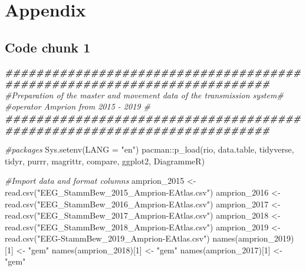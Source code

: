\documentclass[a4paper,11pt]{article}
\newenvironment{Shaded}{\begin{snugshade}}{\end{snugshade}}
\newcommand{\AttributeTok}[1]{\textcolor[rgb]{0.77,0.63,0.00}{#1}}
\newcommand{\CommentTok}[1]{\textcolor[rgb]{0.56,0.35,0.01}{\textit{#1}}}
\newcommand{\DecValTok}[1]{\textcolor[rgb]{0.00,0.00,0.81}{#1}}
\newcommand{\DocumentationTok}[1]{\textcolor[rgb]{0.56,0.35,0.01}{\textbf{\textit{#1}}}}
\newcommand{\FunctionTok}[1]{\textcolor[rgb]{0.00,0.00,0.00}{#1}}
\newcommand{\NormalTok}[1]{#1}
\newcommand{\OtherTok}[1]{\textcolor[rgb]{0.56,0.35,0.01}{#1}}
\newcommand{\SpecialCharTok}[1]{\textcolor[rgb]{0.00,0.00,0.00}{#1}}
\newcommand{\StringTok}[1]{\textcolor[rgb]{0.31,0.60,0.02}{#1}}
\begin{document}
\newpage

\appendix

\hypertarget{appendix}{%
\section{Appendix}\label{appendix}}

\hypertarget{code-chunk-1}{%
\subsection{Code chunk 1}\label{code-chunk-1}}
\begin{Shaded}
\begin{Highlighting}[]
\DocumentationTok{\#\#\#\#\#\#\#\#\#\#\#\#\#\#\#\#\#\#\#\#\#\#\#\#\#\#\#\#\#\#\#\#\#\#\#\#\#\#\#\#\#\#\#\#\#\#\#\#\#\#\#\#\#\#\#\#\#\#\#\#\#\#\#\#\#\#\#\#\#\#\#\#}
\CommentTok{\#Preparation of the master and movement data of the transmission system\# }
\CommentTok{\#operator Amprion from 2015 {-} 2019                                     \#}
\DocumentationTok{\#\#\#\#\#\#\#\#\#\#\#\#\#\#\#\#\#\#\#\#\#\#\#\#\#\#\#\#\#\#\#\#\#\#\#\#\#\#\#\#\#\#\#\#\#\#\#\#\#\#\#\#\#\#\#\#\#\#\#\#\#\#\#\#\#\#\#\#\#\#\#\#}

\CommentTok{\#packages}
\FunctionTok{Sys.setenv}\NormalTok{(}\AttributeTok{LANG =} \StringTok{"en"}\NormalTok{)}
\NormalTok{pacman}\SpecialCharTok{::}\FunctionTok{p\_load}\NormalTok{(rio, data.table, tidyverse, tidyr, purrr, magrittr, compare, }
\NormalTok{               ggplot2, DiagrammeR)}

\CommentTok{\#Import data and format columns}
\NormalTok{amprion\_2015 }\OtherTok{\textless{}{-}} \FunctionTok{read.csv}\NormalTok{(}\StringTok{"EEG\_StammBew\_2015\_Amprion{-}EAtlas.csv"}\NormalTok{)}
\NormalTok{amprion\_2016 }\OtherTok{\textless{}{-}} \FunctionTok{read.csv}\NormalTok{(}\StringTok{"EEG\_StammBew\_2016\_Amprion{-}EAtlas.csv"}\NormalTok{)}
\NormalTok{amprion\_2017 }\OtherTok{\textless{}{-}} \FunctionTok{read.csv}\NormalTok{(}\StringTok{"EEG\_StammBew\_2017\_Amprion{-}EAtlas.csv"}\NormalTok{)}
\NormalTok{amprion\_2018 }\OtherTok{\textless{}{-}} \FunctionTok{read.csv}\NormalTok{(}\StringTok{"EEG\_StammBew\_2018\_Amprion{-}EAtlas.csv"}\NormalTok{)}
\NormalTok{amprion\_2019 }\OtherTok{\textless{}{-}} \FunctionTok{read.csv}\NormalTok{(}\StringTok{"EEG{-}StammBew\_2019\_Amprion{-}EAtlas.csv"}\NormalTok{)}
\FunctionTok{names}\NormalTok{(amprion\_2019)[}\DecValTok{1}\NormalTok{] }\OtherTok{\textless{}{-}} \StringTok{"gem"}
\FunctionTok{names}\NormalTok{(amprion\_2018)[}\DecValTok{1}\NormalTok{] }\OtherTok{\textless{}{-}} \StringTok{"gem"}
\FunctionTok{names}\NormalTok{(amprion\_2017)[}\DecValTok{1}\NormalTok{] }\OtherTok{\textless{}{-}} \StringTok{"gem"}


\end{Highlighting}
\end{Shaded}
\end{document}
